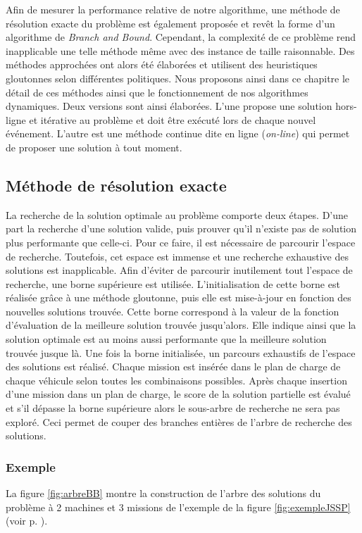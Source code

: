 Afin de mesurer la performance relative de notre algorithme, une méthode de résolution exacte du problème est également proposée et revêt la forme d'un algorithme de \textit{Branch and Bound}. Cependant, la complexité de ce problème rend inapplicable une telle méthode même avec des instance de taille raisonnable. Des méthodes approchées ont alors été élaborées et utilisent des heuristiques gloutonnes selon différentes politiques.
Nous proposons ainsi dans ce chapitre le détail de ces méthodes ainsi que le fonctionnement de nos algorithmes dynamiques. Deux versions sont ainsi élaborées. L'une propose une solution hors-ligne et itérative au problème et doit être exécuté lors de chaque nouvel événement. L'autre est une méthode continue dite en ligne (\textit{on-line}) qui permet de proposer une solution à tout moment.

\subsection{Méthode de résolution exacte} \label{chap:ordo:reso:BB}

La recherche de la solution optimale au problème comporte deux étapes. D'une part la recherche d'une solution valide, puis prouver qu'il n'existe pas de solution plus performante que celle-ci. Pour ce faire, il est nécessaire de parcourir l'espace de recherche. Toutefois, cet espace est immense et une recherche exhaustive des solutions est inapplicable.
Afin d'éviter de parcourir inutilement tout l'espace de recherche, une borne supérieure est utilisée. L'initialisation de cette borne est réalisée grâce à une méthode gloutonne, puis elle est mise-à-jour en fonction des nouvelles solutions trouvée. Cette borne correspond à la valeur de la fonction d'évaluation de la meilleure solution trouvée jusqu'alors. Elle indique ainsi que la solution optimale est au moins aussi performante que la meilleure solution trouvée jusque là.
Une fois la borne initialisée, un parcours exhaustifs de l'espace des solutions est réalisé. Chaque mission est insérée dans le plan de charge de chaque véhicule selon toutes les combinaisons possibles. Après chaque insertion d'une mission dans un plan de charge, le score de la solution partielle est évalué et s'il dépasse la borne supérieure alors le sous-arbre de recherche ne sera pas exploré. Ceci permet de couper des branches entières de l'arbre de recherche des solutions.

\subsubsection{Exemple}
La figure \ref{fig:arbreBB} montre la construction de l'arbre des solutions du problème à 2 machines et 3 missions de l'exemple de la figure \ref{fig:exempleJSSP} (voir p. \pageref{fig:exempleJSSP}).


